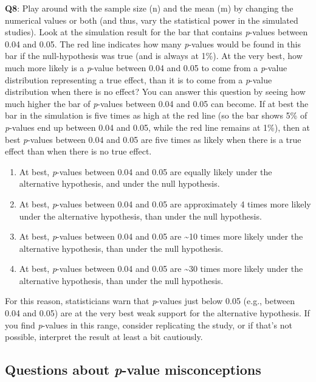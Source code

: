 \documentclass[
]{krantz}
\providecommand{\tightlist}{%
  \setlength{\itemsep}{0pt}\setlength{\parskip}{0pt}}
\begin{document}
\textbf{Q8}: Play around with the sample size (n) and the mean (m) by changing the numerical values or both (and thus, vary the statistical power in the simulated studies). Look at the simulation result for the bar that contains \emph{p}-values between 0.04 and 0.05. The red line indicates how many \emph{p}-values would be found in this bar if the null-hypothesis was true (and is always at 1\%). At the very best, how much more likely is a \emph{p}-value between 0.04 and 0.05 to come from a \emph{p}-value distribution representing a true effect, than it is to come from a \emph{p}-value distribution when there is no effect? You can answer this question by seeing how much higher the bar of \emph{p}-values between 0.04 and 0.05 can become. If at best the bar in the simulation is five times as high at the red line (so the bar shows 5\% of \emph{p}-values end up between 0.04 and 0.05, while the red line remains at 1\%), then at best \emph{p}-values between 0.04 and 0.05 are five times as likely when there is a true effect than when there is no true effect.

\begin{enumerate}
\def\labelenumi{\Alph{enumi})}
\tightlist
\item
  At best, \emph{p}-values between 0.04 and 0.05 are equally likely under the
  alternative hypothesis, and under the null hypothesis.
\item
  At best, \emph{p}-values between 0.04 and 0.05 are approximately 4 times more
  likely under the alternative hypothesis, than under the null hypothesis.
\item
  At best, \emph{p}-values between 0.04 and 0.05 are \textasciitilde10 times more likely under the alternative hypothesis, than under the null hypothesis.
\item
  At best, \emph{p}-values between 0.04 and 0.05 are \textasciitilde30 times more likely under the alternative hypothesis, than under the null hypothesis.
\end{enumerate}

For this reason, statisticians warn that \emph{p}-values just below 0.05 (e.g.,
between 0.04 and 0.05) are at the very best weak support for the alternative
hypothesis. If you find \emph{p}-values in this range, consider replicating the
study, or if that's not possible, interpret the result at least a bit
cautiously.

\hypertarget{questions-about-p-value-misconceptions}{%
\subsection{\texorpdfstring{Questions about \emph{p}-value misconceptions}{Questions about p-value misconceptions}}\label{questions-about-p-value-misconceptions}}
\end{document}
